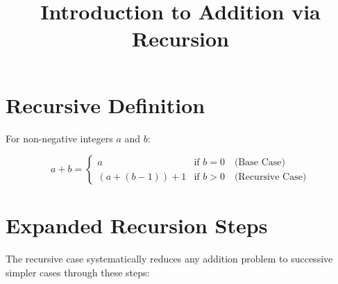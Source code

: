 \documentclass{article}
\title{Introduction to Addition via Recursion}
\author{}
\date{}
\begin{document}
\maketitle

\section{Recursive Definition}
For non-negative integers \(a\) and \(b\):

\[
    a + b = \begin{cases}
        a                 & \text{if } b = 0 \quad \text{(Base Case)}      \\
        (a + (b - 1)) + 1 & \text{if } b > 0 \quad \text{(Recursive Case)}
    \end{cases}
\]

\section{Expanded Recursion Steps}
The recursive case systematically reduces any addition problem to successive simpler cases through these steps:
\end{document}
